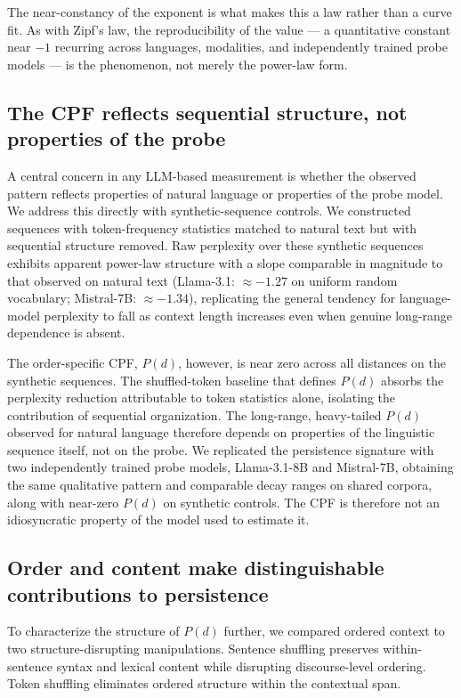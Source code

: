 \documentclass[11pt]{article}
\begin{document}
The near-constancy of the exponent is what makes this a law rather than a curve fit. As with
Zipf's law, the reproducibility of the value --- a quantitative constant near $-1$ recurring
across languages, modalities, and independently trained probe models --- is the phenomenon, not
merely the power-law form.

\subsection{The CPF reflects sequential structure, not properties of the probe}

A central concern in any LLM-based measurement is whether the observed pattern
reflects properties of natural language or properties of the probe model. We address
this directly with synthetic-sequence controls. We constructed sequences with
token-frequency statistics matched to natural text but with sequential structure
removed. Raw perplexity over these synthetic sequences exhibits apparent power-law
structure with a slope comparable in magnitude to that observed on natural text
(Llama-3.1: $\approx -1.27$ on uniform random vocabulary; Mistral-7B: $\approx -1.34$),
replicating the general tendency for language-model perplexity to fall as context
length increases even when genuine long-range dependence is absent.

The order-specific CPF, $P(d)$, however, is near zero across all
distances on the synthetic sequences. The shuffled-token baseline that defines $P(d)$
absorbs the perplexity reduction attributable to token statistics alone, isolating the
contribution of sequential organization. The long-range, heavy-tailed $P(d)$ observed
for natural language therefore depends on properties of the linguistic sequence
itself, not on the probe. We replicated the persistence signature with two
independently trained probe models, Llama-3.1-8B and Mistral-7B, obtaining the same
qualitative pattern and comparable decay ranges on shared corpora, along with near-zero
$P(d)$ on synthetic controls. The CPF is therefore not an idiosyncratic
property of the model used to estimate it.

\subsection{Order and content make distinguishable contributions to persistence}

To characterize the structure of $P(d)$ further, we compared ordered context to two
structure-disrupting manipulations. Sentence shuffling preserves within-sentence syntax
and lexical content while disrupting discourse-level ordering. Token shuffling
eliminates ordered structure within the contextual span.
\end{document}
